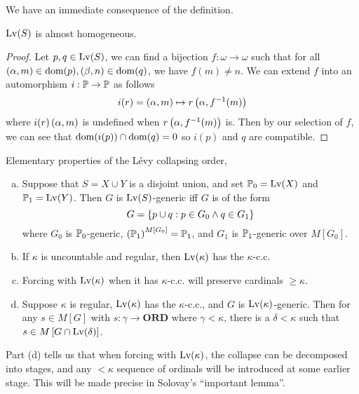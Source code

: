 We have an immediate consequence of the definition.
\begin{proposition}
    \(\Lv(S)\) is almost homogeneous.
\end{proposition}
\begin{proof}
    Let \(p,q\in\Lv(S)\), we can find a bijection \(f:\omega\to\omega\) such that
    for all \((\alpha,m)\in\dom(p), (\beta,n)\in\dom(q)\), we have \(f(m) \ne n\).
    We can extend \(f\) into an automorphism \(i:\P\to\P\) as follows
    \[ i(r) = \paren{\alpha,m}\mapsto r\paren{\alpha, f^{-1}(m)} \]
    where \(i(r)\paren{\alpha,m}\) is undefined when \(r\paren{\alpha,f^{-1}(m)}\) is.
    Then by our selection of \(f\), we can see that \(\dom(i(p)) \cap\dom(q) = 0\) so \(i(p)\) and \(q\) are compatible.
\end{proof}

\begin{lemma} \label{lemma:levy_elementary}
    Elementary properties of the Lévy collapsing order,
    \begin{enumerate}[(a)]
        \item Suppose that \(S = X\cup Y\) is a disjoint union,
            and set \(\P_0 = \Lv(X)\) and \(\P_1 = \Lv(Y)\).
            Then \(G\) is \(\Lv(S)\)-generic iff \(G\) is of the form
            \[G = \set{p\cup q: p\in G_0\land q\in G_1 }\]
            where \(G_0\) is \(\P_0\)-generic, \(\paren{\P_1}^{M[G_0]} = \P_1\),
            and \(G_1\) is \(\P_1\)-generic over \(M[G_0]\).
        \item If \(\kappa\) is uncountable and regular, %
            then \(\Lv(\kappa)\) has the \(\kappa\)-c.c.
        \item Forcing with \(\Lv(\kappa)\) when it has \(\kappa\)-c.c. will preserve cardinals \(\geq \kappa\).
        \item Suppose \(\kappa\) is regular, \(\Lv(\kappa)\) has the \(\kappa\)-c.c., and
            \(G\) is \(\Lv(\kappa)\)-generic.
            Then for any \(s\in M[G]\) with \(s:\gamma \to \mathbf{ORD}\) where \(\gamma < \kappa\),
            there is a \(\delta<\kappa\) such that \(s\in M\sq{G\cap\Lv(\delta)}\).
    \end{enumerate}
\end{lemma}

\begin{remark}

    Part (d) tells us that when forcing with \(\Lv(\kappa)\),
    the collapse can be decomposed into stages, and
    any \(<\kappa\) sequence of ordinals will be introduced at some earlier stage.
    This will be made precise in Solovay's ``important lemma''.
\end{remark}


